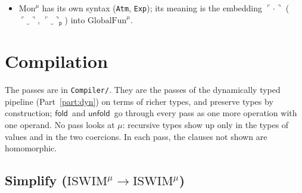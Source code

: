 \documentclass[10pt]{article}
\theoremstyle{acmplain}
\newcommand{\key}[1]{\mathsf{#1}}
\newcommand{\Tembed}[1]{\ulcorner #1 \urcorner}  %
\newcommand{\Tentry}[1]{\mathit{entry}(#1)}
\newcommand{\Tcalled}[1]{\mathit{called}(#1)}
\newcommand{\Treturned}[1]{\mathit{returned}(#1)}
\newcommand{\Ml}[1]{\textrm{#1}^{\mu}}                  %
\newcommand{\Mfold}{\key{fold}\,}
\newcommand{\Munfold}{\key{unfold}\,}
\begin{document}
\begin{itemize}
  (\texttt{reg}, \texttt{slot p lt} with the irrelevant proof \texttt{lt} of
  $|\Delta'| < n$), objects \texttt{Obj}; $\key{load}\;\pi_i$ is \texttt{load},
  $\key{load}\;\key{fst}$ and $\key{load}\;\key{snd}$ are \texttt{loadfst}
  and \texttt{loadsnd r} (which takes its slot from the state);
  $\Treturned{\Delta, C}$, $\Tentry{\Delta}$ and $\Tcalled{k}$ are
  \texttt{returned}, \texttt{entry} and \texttt{called}; a sequence is
  \texttt{Seq $\Sigma$ n R Bs $\psi$}, a body \texttt{body n bs k}. The
  equations about registers that \texttt{subq}, \texttt{callq} and
  \texttt{retq} carry, and \texttt{reg r e} of an operand, are proofs, not
  operands.
\item \textbf{$\Ml{Mon}$} has its own syntax (\texttt{Atm}, \texttt{Exp});
  its meaning is the embedding $\Tembed{\cdot}$ (\texttt{$\ulcorner\_\urcorner$},
  \texttt{$\ulcorner\_\urcorner_{\mathsf{p}}$}) into $\Ml{GlobalFun}$.
\end{itemize}
\section{Compilation}\label{sec:m-passes}

The passes are in \texttt{Compiler/}. They are the passes of the
dynamically typed pipeline (Part~\ref{part:dyn}) on terms of richer
types, and preserve types by construction; $\Mfold$ and $\Munfold$ go
through every pass as one more operation with one operand. No pass looks
at $\mu$: recursive types show up only in the types of values and in the
two coercions. In each pass, the clauses not shown are homomorphic.

\subsection{Simplify (\texorpdfstring{$\Ml{ISWIM} \to \Ml{ISWIM}$}{ISWIM-mu -> ISWIM-mu})}\label{sec:m-simplify}
\end{document}
